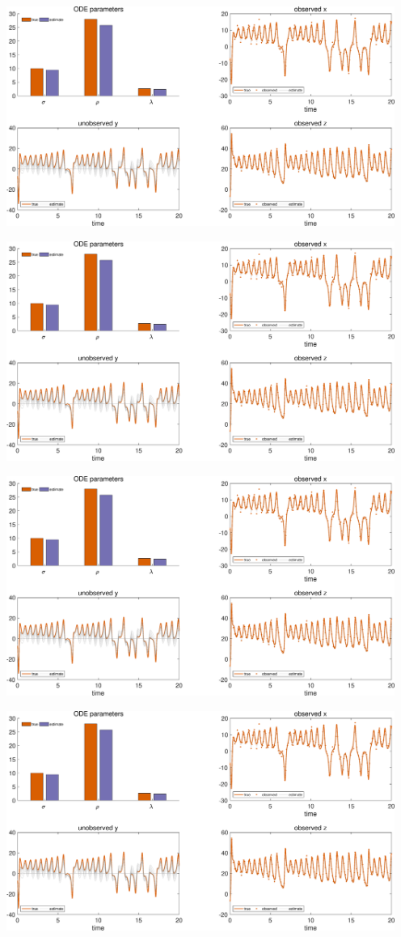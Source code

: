 {\includegraphics [width=5in]{VGM_for_Lorenz_Attractor_26.eps}

\includegraphics [width=5in]{VGM_for_Lorenz_Attractor_27.eps}

\includegraphics [width=5in]{VGM_for_Lorenz_Attractor_28.eps}

\includegraphics [width=5in]{VGM_for_Lorenz_Attractor_29.eps}

}
